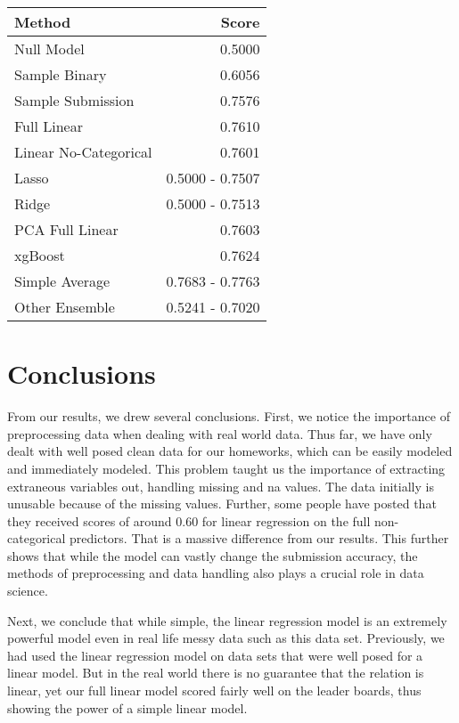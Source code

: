 \documentclass[aps, reprint, groupedaddress, superscriptaddress, amsmath, 10pt]{revtex4-1}
\begin{document}
	
	\begin{table}[ht]
		\large
		\centering
		\begin{tabular}{|l|r|}
			\hline
			Method & Score \\ 
			\hline
			Null Model 				& 0.5000 \\
			Sample Binary	 		& 0.6056 \\
			Sample Submission   	& 0.7576 \\
			Full Linear 			& 0.7610 \\ 
			Linear No-Categorical 	& 0.7601 \\
			Lasso					& 0.5000 - 0.7507 \\
			Ridge					& 0.5000 - 0.7513 \\
			PCA	Full Linear			& 0.7603 \\
			xgBoost					& 0.7624   \\
			Simple Average			& 0.7683 - 0.7763 \\
			Other Ensemble			& 0.5241 - 0.7020 \\
			\hline
		\end{tabular}
	\end{table}
	
	\section{Conclusions}
	From our results, we drew several conclusions.  First, we notice the importance of preprocessing data when dealing with real world data.  Thus far, we have only dealt with well posed clean data for our homeworks, which can be easily modeled and immediately modeled.  This problem taught us the importance of extracting extraneous variables out, handling missing and na values.  The data initially is unusable because of the missing values.  Further, some people have posted that they received scores of around 0.60 for linear regression on the full non-categorical predictors.  That is a massive difference from our results.  This further shows that while the model can vastly change the submission accuracy, the methods of preprocessing and data handling also plays a crucial role in data science.
	
	Next, we conclude that while simple, the linear regression model is an extremely powerful model even in real life messy data such as this data set.  Previously, we had used the linear regression model on data sets that were well posed for a linear model.  But in the real world there is no guarantee that the relation is linear, yet our full linear model scored fairly well on the leader boards, thus showing the power of a simple linear model.  
	
\end{document}
